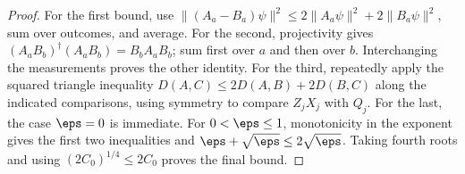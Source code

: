 \begin{proof}
	\leanok
	For the first bound, use
	$\|(A_a-B_a)\psi\|^2\leq2\|A_a\psi\|^2+2\|B_a\psi\|^2$,
	sum over outcomes, and average. For the second, projectivity gives
	$(A_aB_b)^\dagger(A_aB_b)=B_bA_aB_b$; sum first over $a$ and then
	over $b$. Interchanging the measurements proves the other identity.
	For the third, repeatedly apply the squared triangle inequality
	$D(A,C)\leq2D(A,B)+2D(B,C)$ along the indicated comparisons, using
	symmetry to compare $Z_jX_j$ with $Q_j$.
	For the last, the case $\eps=0$ is immediate. For $0<\eps\leq1$,
	monotonicity in the exponent gives the first two inequalities and
	$\eps+\sqrt\eps\leq2\sqrt\eps$. Taking fourth roots and using
	$(2C_0)^{1/4}\leq2C_0$ proves the final bound.
\end{proof}

